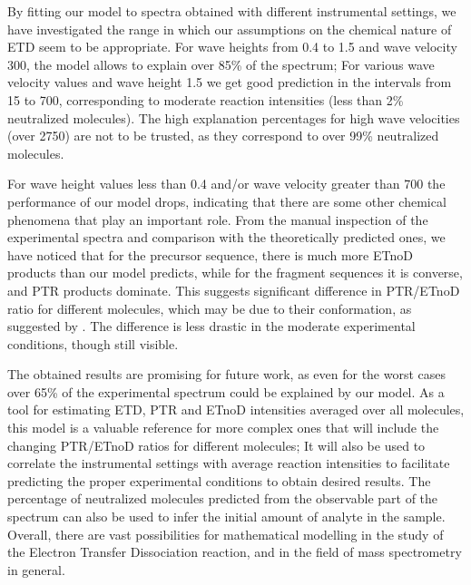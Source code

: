 \documentclass{llncs}
\begin{document}
        By fitting our model to spectra obtained with different instrumental settings, we have investigated the range in which our assumptions on the chemical nature of ETD seem to be appropriate. For wave heights from 0.4 to 1.5 and wave velocity 300, the model allows to explain over 85\% of the spectrum; For various wave velocity values and wave height 1.5 we get good prediction in the intervals from 15 to 700, corresponding to moderate reaction intensities (less than 2\% neutralized molecules). The high explanation percentages for high wave velocities (over 2750) are not to be trusted, as they correspond to over 99\% neutralized molecules.

        For wave height values less than 0.4 and/or wave velocity greater than 700 the performance of our model drops, indicating that there are some other chemical phenomena that play an important role. From the manual inspection of the experimental spectra and comparison with the theoretically predicted ones, we have noticed that for the precursor sequence, there is much more ETnoD products than our model predicts, while for the fragment sequences it is converse, and PTR products dominate. This suggests significant difference in PTR/ETnoD ratio for different molecules, which may be due to their conformation, as suggested by \cite{Lermyte2016}. The difference is less drastic in the moderate experimental conditions, though still visible.

	The obtained results are promising for future work, as even for the worst cases over 65\% of the experimental spectrum could be explained by our model. As a tool for estimating ETD, PTR and ETnoD intensities averaged over all molecules, this model is a valuable reference for more complex ones that will include the changing PTR/ETnoD ratios for different molecules; It will also be used to correlate the instrumental settings with average reaction intensities to facilitate predicting the proper experimental conditions to obtain desired results. The percentage of neutralized molecules predicted from the observable part of the spectrum can also be used to infer the initial amount of analyte in the sample. Overall, there are vast possibilities for mathematical modelling in the study of the Electron Transfer Dissociation reaction, and in the field of mass spectrometry in general.

% 

{\footnotesize}
\end{document}
